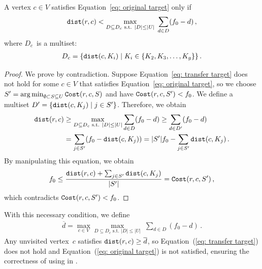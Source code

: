 \begin{lemma}
\label{lem: dist_max}
    A vertex $c \in V$ satisfies Equation~\eqref{eq: original target} only if
    \begin{gather}
    \label{eq: transfer target}
        \mathtt{dist}(r,c) < \max_{D \subseteq D_{c} \text{ s.t. } |D|\leq |U|}\; \sum_{d\in D} (f_0-d) \,,
    \end{gather}
    \noindent where $D_{c}$~is a multiset:
    \begin{gather}
    \label{eq: Lcf}
        D_{c}=\{\mathtt{dist}(c,K_i) \mid K_i\in\{K_2,K_3,\dots,K_g\}\} \,.
    \end{gather}
\end{lemma}
\begin{proof}
    We prove by contradiction. Suppose Equation~\eqref{eq: transfer target} does not hold for some $c \in V$ that satisfies Equation~\eqref{eq: original target}, so we choose $S' = \operatorname*{arg\,min}_{\emptyset \subset S \subseteq U} \mathtt{Cost}(r,c,S)$ and have $\mathtt{Cost}(r,c,S') < f_0$. We define a multiset $D' = \{\mathtt{dist}(c,K_j)\mid j\in S'\}$. Therefore, we obtain
    \begin{gather}
    \label{eq: one_step_chain}
    \begin{aligned}
    \mathtt{dist}(r,c) & \geq \max_{\substack{D\subseteq D_{c} \text{ s.t. } |D|\leq |U|}} \sum_{d\in D}(f_0-d) \geq \sum_{d\in D'}(f_0-d)\\
    &= \sum_{j\in S'}(f_0-\mathtt{dist}(c,K_j))
    = |S'|f_0-\sum_{j\in S'}\mathtt{dist}(c,K_j) \,.
    \end{aligned}
    \end{gather}
    \noindent By manipulating this equation, we obtain
    \begin{gather}
    \label{eq: avg_contrad}
    f_0 \leq \frac{\mathtt{dist}(r,c)+\sum_{j\in S'}\mathtt{dist}(c,K_j)}{|S'|} = \mathtt{Cost}(r,c,S') \,,
    \end{gather}
    which contradicts $\mathtt{Cost}(r,c,S') < f_0$.
\end{proof}

With this necessary condition, we define
\begin{gather}
    \label{eq: defi_dub}
        \overline{d}=\max_{c\in V}\max_{D \subseteq D_{c} \text{ s.t. } |D|\leq |U|}\; \sum_{d\in D}(f_0-d) \,.
\end{gather}
\noindent Any unvisited vertex~$c$ satisfies $\mathtt{dist}(r,c) \geq \overline{d}$, so Equation~(\ref{eq: transfer target}) does not hold and Equation~(\ref{eq: original target}) is not satisfied, ensuring the correctness of using \PartialDijkstra in \Improved.

